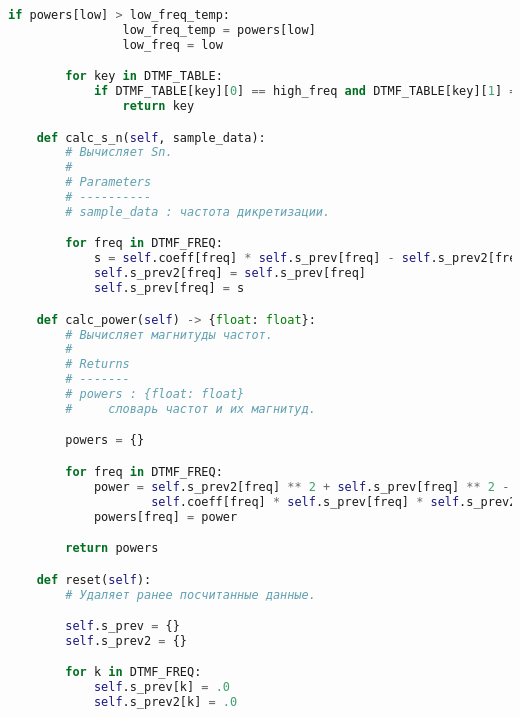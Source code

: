 \begin{lstlisting}[language=python]
            if powers[low] > low_freq_temp:
                low_freq_temp = powers[low]
                low_freq = low

        for key in DTMF_TABLE:
            if DTMF_TABLE[key][0] == high_freq and DTMF_TABLE[key][1] == low_freq:
                return key

    def calc_s_n(self, sample_data):
        # Вычисляет Sn.
        #
        # Parameters
        # ----------
        # sample_data : частота дикретизации.

        for freq in DTMF_FREQ:
            s = self.coeff[freq] * self.s_prev[freq] - self.s_prev2[freq] + sample_data
            self.s_prev2[freq] = self.s_prev[freq]
            self.s_prev[freq] = s

    def calc_power(self) -> {float: float}:
        # Вычисляет магнитуды частот.
        #
        # Returns
        # -------
        # powers : {float: float}
        #     словарь частот и их магнитуд.

        powers = {}

        for freq in DTMF_FREQ:
            power = self.s_prev2[freq] ** 2 + self.s_prev[freq] ** 2 - \
                    self.coeff[freq] * self.s_prev[freq] * self.s_prev2[freq]
            powers[freq] = power

        return powers

    def reset(self):
        # Удаляет ранее посчитанные данные.

        self.s_prev = {}
        self.s_prev2 = {}

        for k in DTMF_FREQ:
            self.s_prev[k] = .0
            self.s_prev2[k] = .0

\end{lstlisting}

